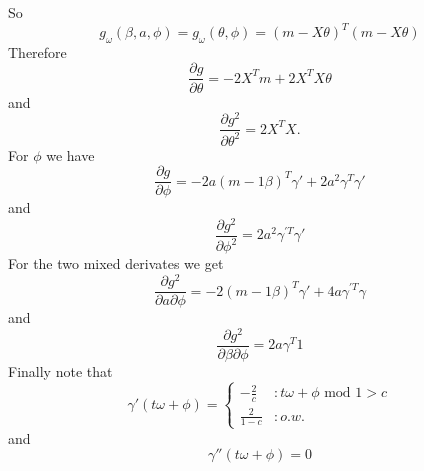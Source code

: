 \documentclass[12pt]{article}
\begin{document}
So
\begin{equation*}
g_\omega(\beta,a,\phi) = g_\omega(\theta,\phi) = (m - X\theta)^T(m - X\theta)
\end{equation*}
Therefore
\begin{equation*}
\frac{\partial g}{\partial \theta} = -2X^Tm + 2X^TX\theta
\end{equation*}
and
\begin{equation*}
\frac{\partial g^2}{\partial \theta^2} = 2X^TX.
\end{equation*}
For $\phi$ we have
\begin{equation*}
\frac{\partial g}{\partial \phi} = -2a(m - 1\beta)^T\gamma' + 2a^2\gamma^T\gamma'
\end{equation*}
and
\begin{equation*}
\frac{\partial g^2}{\partial \phi^2} = 2a^2\gamma^{'T}\gamma'
\end{equation*}
For the two mixed derivates we get
\begin{equation*}
\frac{\partial g^2}{\partial a \partial \phi} = -2(m-1\beta)^T\gamma' + 4a\gamma^{'T}\gamma
\end{equation*}
and
\begin{equation*}
\frac{\partial g^2}{\partial \beta \partial \phi} = 2a\gamma^T1
\end{equation*}
Finally note that
\begin{equation*}
  \gamma'(t\omega + \phi) =    \left\{
  \begin{array}{lr}
     - \frac{2}{c} &:  t\omega + \phi \text{ mod } 1 > c\\ 
    \frac{2}{1-c}  &: o.w.
  \end{array} \right.
\end{equation*}
and
\begin{equation*}
  \gamma''(t\omega + \phi) =    0
\end{equation*}





%
%
\end{document}
